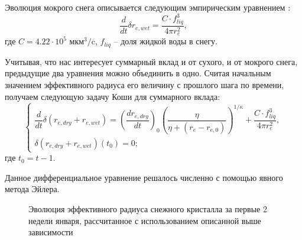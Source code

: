 \documentclass[a4paper, fontsize=14pt]{scrartcl}
\begin{document}
Эволюция мокрого снега описывается следующим эмпирическим уравнением \cite{CLM4.5tech, Brun1989}:
\begin{equation}
\dfrac{d}{dt} \delta r_{e , wet} = \dfrac{C \cdot f_{liq}^3} {4 \pi r_{e}^2}, \label{sys}
\end{equation}
где $C = 4.22 \cdot 10^{5}$ мкм$^3/$c, $f_{liq}$ -- доля жидкой воды в снегу.

Учитывая, что нас интересует суммарный вклад и от сухого, и от мокрого снега, предыдущие два уравнения можно объединить в одно. Считая начальным значением эффективного радиуса его величину с прошлого шага по времени, получаем следующую задачу Коши для суммарного вклада:
\begin{equation}
    \begin{cases}
        \dfrac{d}{dt} \delta (r_{e , dry} + r_{e , wet}) = {\left( \dfrac{dr_{e , dry}}{dt} \right)}_0 \left(\dfrac{\eta}{\eta + (r_e - r_{e, 0})}\right)^{1 / \kappa} + \dfrac{C \cdot f_{liq}^3} {4 \pi r_{e}^2} ,
        \\
        \delta (r_{e , dry} + r_{e , wet})(t_0) = 0; 
    \end{cases} \label{sysRDS2}
\end{equation}
где $t_0 = t - 1$. 

\newpage
Данное дифференциальное уравнение решалось численно с помощью явного метода Эйлера.

\begin{figure}[h]
    \caption{Эволюция эффективного радиуса снежного кристалла за первые 2 недели января, рассчитанное с использованием описанной выше зависимости}
    \label{fig:image}
\end{figure}
 
\end{document}
